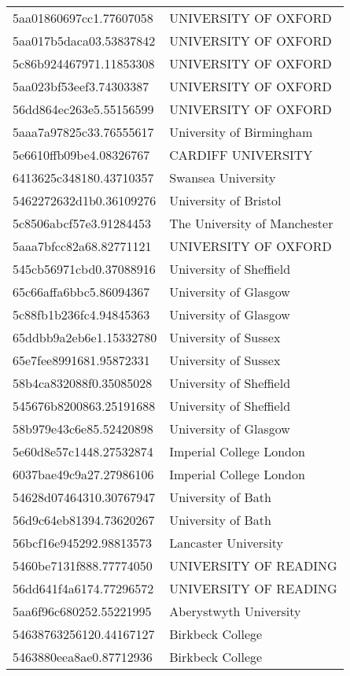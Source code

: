 \begin{tabular}{ll}
5aa01860697cc1.77607058 & UNIVERSITY OF OXFORD \\
5aa017b5daca03.53837842 & UNIVERSITY OF OXFORD \\
5c86b924467971.11853308 & UNIVERSITY OF OXFORD \\
5aa023bf53eef3.74303387 & UNIVERSITY OF OXFORD \\
56dd864ec263e5.55156599 & UNIVERSITY OF OXFORD \\
5aaa7a97825c33.76555617 & University of Birmingham \\
5e6610ffb09be4.08326767 & CARDIFF UNIVERSITY \\
6413625c348180.43710357 & Swansea University \\
5462272632d1b0.36109276 & University of Bristol \\
5c8506abcf57e3.91284453 & The University of Manchester \\
5aaa7bfcc82a68.82771121 & UNIVERSITY OF OXFORD \\
545cb56971cbd0.37088916 & University of Sheffield \\
65c66affa6bbc5.86094367 & University of Glasgow \\
5c88fb1b236fc4.94845363 & University of Glasgow \\
65ddbb9a2eb6e1.15332780 & University of Sussex \\
65e7fee8991681.95872331 & University of Sussex \\
58b4ca832088f0.35085028 & University of Sheffield \\
545676b8200863.25191688 & University of Sheffield \\
58b979e43c6e85.52420898 & University of Glasgow \\
5e60d8e57c1448.27532874 & Imperial College London \\
6037bae49c9a27.27986106 & Imperial College London \\
54628d07464310.30767947 & University of Bath \\
56d9c64eb81394.73620267 & University of Bath \\
56bcf16e945292.98813573 & Lancaster University \\
5460be7131f888.77774050 & UNIVERSITY OF READING \\
56dd641f4a6174.77296572 & UNIVERSITY OF READING \\
5aa6f96c680252.55221995 & Aberystwyth University \\
54638763256120.44167127 & Birkbeck College \\
5463880eea8ae0.87712936 & Birkbeck College \\

\end{tabular}
